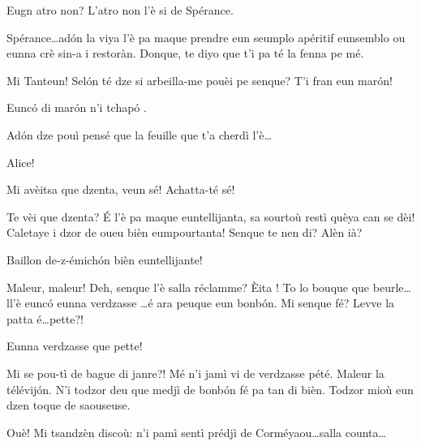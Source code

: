 \begin{drama}
\Tanteunspeaks Eugn atro non? L'atro non l'è si de Spérance.


\Tanteunspeaks Spérance\ldots ad\'on la viya l'è pa maque prendre eun seumplo apéritif eunsemblo ou eunna crè sin-a i restoràn. Donque, te diyo que t'i pa té la fenna pe mé.

\Sperancespeaks Mi Tanteun! Sel\'on té dze si arbeilla-me pouèi pe senque? T'i fran eun mar\'on! 


\Tanteunspeaks{} Eunc\'o di mar\'on n'i tchap\'o .

\Mariespeaks Ad\'on dze pouì pensé que la feuille que t'a cherdì l'è\ldots

\Tanteunspeaks{} Alice!


\Tanteunspeaks Mi avèitsa que dzenta, veun sé! Achatta-té sé!


\Tanteunspeaks{} Te vèi que dzenta? \'E l'è pa maque euntellijanta, sa sourtoù restì quèya can se dèi! Caletaye i dzor de oueu bièn eumpourtanta! Senque te nen di? Alèn ià?





\Vioujspeaks Baillon de-z-émich\'on bièn euntellijante!

\Vioupspeaks Maleur, maleur! Deh, senque l'è salla réclamme? \`Eita ! To lo bouque que beurle\ldots ll'è eunc\'o eunna verdzasse \ldots é ara peuque eun bonb\'on. Mi senque fé? Levve la patta é\ldots pette?! 


\Vioujspeaks Eunna verdzasse que pette!

\Vioupspeaks Mi se pou-tì de bague di janre?! Mé n'i jamì vi de verdzasse pété. Maleur la télévij\'on. N'i todzor deu que medjì de bonb\'on fé pa tan di bièn. Todzor mioù eun dzen toque de saouseuse.

\Vioujspeaks Ouè! Mi tsandzèn discoù:  n'i pamì sentì prédjì de Corméyaou\ldots salla counta\ldots


\end{drama}
